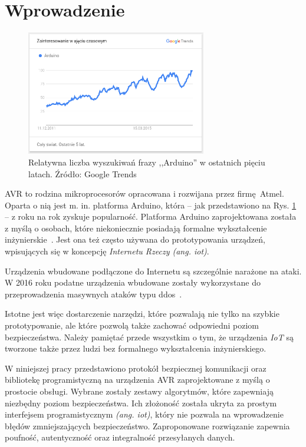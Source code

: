\chapter*{Wprowadzenie}
\label{cha:wstep}


\begin{figure}[h]
\centering
\includegraphics[width=0.7\textwidth]{images/arduino-trends.png}
\caption{Relatywna liczba wyszukiwań frazy ,,Arduino'' w ostatnich pięciu latach. Źródło: Google Trends}
\label{fig:arduinotrends}
\end{figure}

AVR to rodzina mikroprocesorów opracowana i rozwijana przez firmę Atmel. Oparta o nią jest m. in. platforma Arduino, która -- jak przedstawiono na Rys. \ref{fig:arduinotrends} -- z roku na rok zyskuje popularność. Platforma Arduino zaprojektowana została z myślą o osobach, które niekoniecznie posiadają formalne wykształcenie inżynierskie~\cite{BanShi14}. Jest ona też często używana do prototypowania urządzeń, wpisujących się w koncepcję \emph{Internetu Rzeczy (ang. \gls{iot})}.

Urządzenia wbudowane podłączone do Internetu są szczególnie narażone na ataki. W 2016 roku podatne urządzenia wbudowane zostały wykorzystane do przeprowadzenia masywnych ataków typu \gls{ddos}~\cite{AkaIOT}.

Istotne jest więc dostarczenie narzędzi, które pozwalają nie tylko na szybkie prototypowanie, ale które pozwolą także zachować odpowiedni poziom bezpieczeństwa. Należy pamiętać przede wszystkim o tym, że urządzenia \emph{IoT} są tworzone także przez ludzi bez formalnego wykształcenia inżynierskiego.

W niniejszej pracy przedstawiono protokół bezpiecznej komunikacji oraz bibliotekę programistyczną na urządzenia AVR zaprojektowane z myślą o prostocie obsługi. Wybrane zostały zestawy algorytmów, które zapewniają niezbędny poziom bezpieczeństwa. Ich złożoność została ukryta za prostym interfejsem programistycznym \emph{(ang. \acrshort{iot})}, który nie pozwala na wprowadzenie błędów zmniejszających bezpieczeństwo.  Zaproponowane rozwiązanie zapewnia poufność, autentyczność oraz integralność przesyłanych danych.

